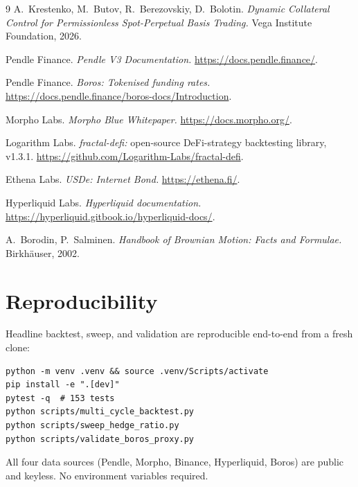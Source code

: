 \documentclass[11pt,a4paper]{article}
\begin{document}
\begin{thebibliography}{9}
A.~Krestenko, M.~Butov, R.~Berezovskiy, D.~Bolotin.
\emph{Dynamic Collateral Control for Permissionless Spot-Perpetual
Basis Trading.} Vega Institute Foundation, 2026.

Pendle Finance. \emph{Pendle V3 Documentation.}
\url{https://docs.pendle.finance/}.

Pendle Finance. \emph{Boros: Tokenised funding rates.}
\url{https://docs.pendle.finance/boros-docs/Introduction}.

Morpho Labs. \emph{Morpho Blue Whitepaper.}
\url{https://docs.morpho.org/}.

Logarithm Labs. \emph{fractal-defi:} open-source DeFi-strategy
backtesting library, v1.3.1.
\url{https://github.com/Logarithm-Labs/fractal-defi}.

Ethena Labs. \emph{USDe: Internet Bond.}
\url{https://ethena.fi/}.

Hyperliquid Labs. \emph{Hyperliquid documentation.}
\url{https://hyperliquid.gitbook.io/hyperliquid-docs/}.

A.~Borodin, P.~Salminen. \emph{Handbook of Brownian Motion:
Facts and Formulae.} Birkh\"auser, 2002.
\end{thebibliography}

\appendix

\section{Reproducibility}

Headline backtest, sweep, and validation are reproducible end-to-end
from a fresh clone:

\begin{verbatim}
python -m venv .venv && source .venv/Scripts/activate
pip install -e ".[dev]"
pytest -q  # 153 tests
python scripts/multi_cycle_backtest.py
python scripts/sweep_hedge_ratio.py
python scripts/validate_boros_proxy.py
\end{verbatim}

All four data sources (Pendle, Morpho, Binance, Hyperliquid,
Boros) are public and keyless. No environment variables required.
\end{document}
